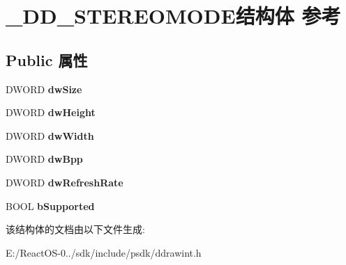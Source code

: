 \hypertarget{struct___d_d___s_t_e_r_e_o_m_o_d_e}{}\section{\+\_\+\+D\+D\+\_\+\+S\+T\+E\+R\+E\+O\+M\+O\+D\+E结构体 参考}
\label{struct___d_d___s_t_e_r_e_o_m_o_d_e}
\subsection*{Public 属性}
\begin{DoxyCompactItemize}
\item 
\mbox{\label{struct___d_d___s_t_e_r_e_o_m_o_d_e_ade421e53c9ffc8f90e691c71894a1760}} 
D\+W\+O\+RD {\bfseries dw\+Size}
\item 
\mbox{\label{struct___d_d___s_t_e_r_e_o_m_o_d_e_af3d3d0b6c7a4d4f1d06d3a3e528e912a}} 
D\+W\+O\+RD {\bfseries dw\+Height}
\item 
\mbox{\label{struct___d_d___s_t_e_r_e_o_m_o_d_e_a7072c33aababb23aba105048e1980829}} 
D\+W\+O\+RD {\bfseries dw\+Width}
\item 
\mbox{\label{struct___d_d___s_t_e_r_e_o_m_o_d_e_a217431d7974e5dcc806db23ae1644265}} 
D\+W\+O\+RD {\bfseries dw\+Bpp}
\item 
\mbox{\label{struct___d_d___s_t_e_r_e_o_m_o_d_e_a52ca016154c9452b0ed09deb9c99e6b6}} 
D\+W\+O\+RD {\bfseries dw\+Refresh\+Rate}
\item 
\mbox{\label{struct___d_d___s_t_e_r_e_o_m_o_d_e_acce7b40f6f63a2004dc8f3318d136af0}} 
B\+O\+OL {\bfseries b\+Supported}
\end{DoxyCompactItemize}


该结构体的文档由以下文件生成\+:\begin{DoxyCompactItemize}
\item 
E\+:/\+React\+O\+S-\/0../sdk/include/psdk/ddrawint.\+h\end{DoxyCompactItemize}
